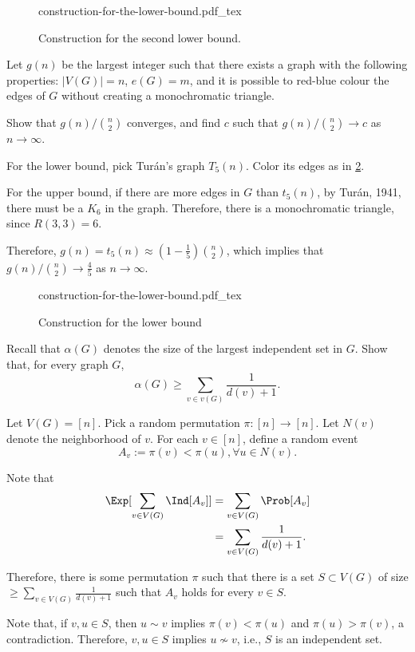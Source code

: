 \documentclass[10pt, a4paper]{article}
\newcommand{\incfig}[2][1]{%
    \def\svgwidth{#1\columnwidth}
    {#2.pdf_tex}
}
\begin{document}
\begin{figure}[ht]
    \centering
	\incfig[.5]{construction-for-the-lower-bound}
    \caption{Construction for the second lower bound. }
    \label{fig:construction-for-the-second-lower-bound}
\end{figure}

\newpage
\begin{prob}
	Let $g(n)$ be the largest integer such that there exists a graph with the following properties: $|V(G)| = n$, $e(G) = m$, and it is possible to red-blue colour the edges of $G$ without creating a monochromatic triangle.

	Show that $g(n)/\binom{n}{2}$ converges, and find $c$ such that $g(n)/\binom{n}{2} \to c$ as $n \to \infty$.
\end{prob}
\begin{sol}
	For the lower bound, pick Turán's graph $T_5(n)$. Color its edges as in \cref{fig:construction-for-the-lower-bound}.

	For the upper bound, if there are more edges in $G$ than $t_5(n)$, by Turán, 1941, there must be a $K_6$ in the graph. Therefore, there is a monochromatic triangle, since $R(3, 3) = 6$.

	Therefore, $g(n) = t_5(n) \approx \left(1 - \frac{1}{5}\right)\binom{n}{2}$, which implies that $g(n)/\binom{n}{2} \to \frac{4}{5}$ as $n \to \infty$.
\end{sol}

\begin{figure}[ht]
    \centering
	\incfig[.5]{construction-for-the-lower-bound}
    \caption{Construction for the lower bound}
    \label{fig:construction-for-the-lower-bound}
\end{figure}

\newpage
\begin{prob}
	Recall that $\alpha(G)$ denotes the size of the largest independent set in $G$. Show that, for every graph $G$, \[
		\alpha(G) \geqslant \sum_{v \in v(G)} \frac{1}{d(v) + 1}.
	\]
\end{prob}
\begin{sol}
	Let $V(G) = [n].$
	Pick a random permutation $\pi \colon [n] \to [n]$. Let $N(v)$ denote the neighborhood of $v$. For each $v \in [n]$, define a random event \[A_v := \pi(v) < \pi(u), \forall u \in N(v).\]

	Note that \begin{align*}
		\Exp[\sum_{v \in V(G)}\Ind[A_v]] &= \sum_{v \in V(G)} \Prob[A_v]\\
										 &= \sum_{v \in V(G)} \frac{1}{d(v) + 1}.
	\end{align*}

	Therefore, there is some permutation $\pi$ such that there is a set $S \subset V(G)$ of size $\geqslant \sum_{v \in V(G)} \frac{1}{d(v) + 1}$ such that $A_v$ holds for every $v \in S$.

	Note that, if $v, u \in S$, then $u \sim v$ implies $\pi(v) < \pi(u)$ and $\pi(u) > \pi(v)$, a contradiction. Therefore, $v, u \in S$ implies $u \not\sim v$, i.e., $S$ is an independent set.
\end{sol}
\end{document}
